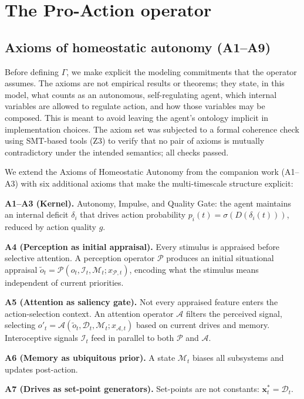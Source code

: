 \documentclass{article}
\begin{document}
\section{The Pro-Action operator}

\subsection{Axioms of homeostatic autonomy (A1--A9)}

Before defining $\Gamma$, we make explicit the modeling commitments that the operator assumes. The axioms are not empirical results or theorems; they state, in this model, what counts as an autonomous, self-regulating agent, which internal variables are allowed to regulate action, and how those variables may be composed. This is meant to avoid leaving the agent's ontology implicit in implementation choices. The axiom set was subjected to a formal coherence check using SMT-based tools (Z3) to verify that no pair of axioms is mutually contradictory under the intended semantics; all checks passed.

We extend the Axioms of Homeostatic Autonomy from the companion work (A1--A3) with six additional axioms that make the multi-timescale structure explicit:

\textbf{A1--A3 (Kernel).} Autonomy, Impulse, and Quality Gate: the agent maintains an internal deficit $\delta_i$ that drives action probability $p_i(t) = \sigma(D(\delta_i(t)))$, reduced by action quality $g$.

\textbf{A4 (Perception as initial appraisal).} Every stimulus is appraised before selective attention. A perception operator $\mathcal{P}$ produces an initial situational appraisal $\tilde o_t = \mathcal{P}(o_t, \mathcal{I}_t, \mathcal{M}_t; x_{\mathcal{P},t})$, encoding what the stimulus means independent of current priorities.

\textbf{A5 (Attention as saliency gate).} Not every appraised feature enters the action-selection context. An attention operator $\mathcal{A}$ filters the perceived signal, selecting $o'_t = \mathcal{A}(\tilde o_t, \mathcal{D}_t, \mathcal{M}_t; x_{\mathcal{A},t})$ based on current drives and memory. Interoceptive signals $\mathcal{I}_t$ feed in parallel to both $\mathcal{P}$ and $\mathcal{A}$.

\textbf{A6 (Memory as ubiquitous prior).} A state $\mathcal{M}_t$ biases all subsystems and updates post-action.

\textbf{A7 (Drives as set-point generators).} Set-points are not constants: $\mathbf{x}^{*}_t = \mathcal{D}_t$.
\end{document}
